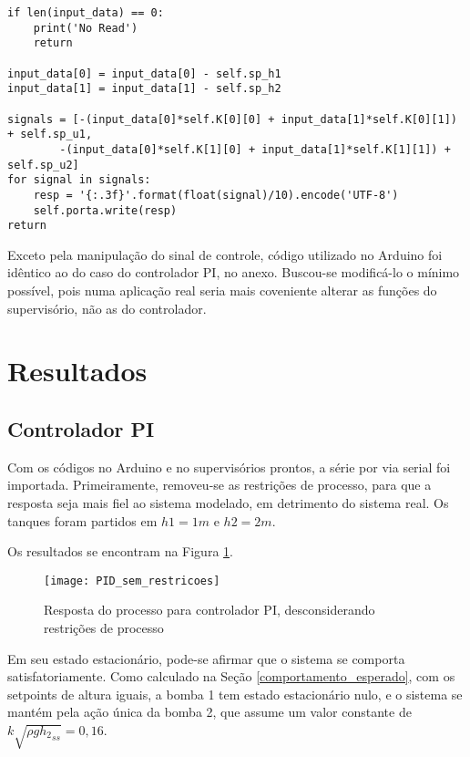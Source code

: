 \begin{code}
\begin{lstlisting}
if len(input_data) == 0:
	print('No Read')
	return

input_data[0] = input_data[0] - self.sp_h1
input_data[1] = input_data[1] - self.sp_h2

signals = [-(input_data[0]*self.K[0][0] + input_data[1]*self.K[0][1]) + self.sp_u1,
		-(input_data[0]*self.K[1][0] + input_data[1]*self.K[1][1]) + self.sp_u2]
for signal in signals:
	resp = '{:.3f}'.format(float(signal)/10).encode('UTF-8')
	self.porta.write(resp)
return
\end{lstlisting}
\label{code_lqr_loop}
\end{code}

Exceto pela manipulação do sinal de controle, código utilizado no Arduino foi idêntico ao do caso do controlador PI, no anexo. Buscou-se modificá-lo o mínimo possível, pois numa aplicação real seria mais coveniente alterar as funções do supervisório, não as do controlador.

\section{Resultados}

\subsection{Controlador PI}

Com os códigos no Arduino e no supervisórios prontos, a série por via serial foi importada. Primeiramente, removeu-se as restrições de processo, para que a resposta seja mais fiel ao sistema modelado, em detrimento do sistema real. Os tanques foram partidos em $h1 = 1m$ e $h2 = 2m$.

Os resultados se encontram na Figura \ref{img_pid_sem_restricoes}.

\begin{figure}[hbt]
	\centering
	\texttt{[image: PID\_sem\_restricoes]}
	\caption{Resposta do processo para controlador PI, desconsiderando restrições de processo}
	\label{img_pid_sem_restricoes}
\end{figure}

Em seu estado estacionário, pode-se afirmar que o sistema se comporta satisfatoriamente. Como calculado na Seção \ref{comportamento_esperado}, com os setpoints de altura iguais, a bomba 1 tem estado estacionário nulo, e o sistema se mantém pela ação única da bomba 2, que assume um valor constante de $k \sqrt{\rho g{h_2}_{ss}} = 0,16$.

